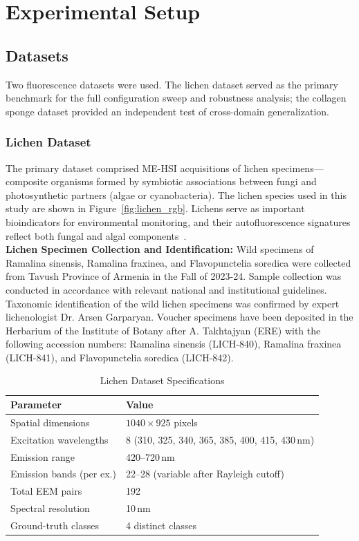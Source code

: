 \section{Experimental Setup}
\label{sec:experimental_setup}
\subsection{Datasets}
\label{sec:datasets}

Two fluorescence datasets were used. The lichen dataset served as the primary benchmark for the full configuration sweep and robustness analysis; the collagen sponge dataset provided an independent test of cross-domain generalization.

\subsubsection{Lichen Dataset}
\label{sec:dataset_lichen}

The primary dataset comprised ME-HSI acquisitions of lichen specimens---composite organisms formed by symbiotic associations between fungi and photosynthetic partners (algae or cyanobacteria).
The lichen species used in this study are shown in Figure~\ref{fig:lichen_rgb}.
Lichens serve as important bioindicators for environmental monitoring, and their autofluorescence signatures reflect both fungal and algal components~\cite{meysurova2021optical}.\\
\textbf{Lichen Specimen Collection and Identification:} Wild specimens of Ramalina sinensis, Ramalina fraxinea, and Flavopunctelia soredica were collected from Tavush Province of Armenia in the Fall of 2023-24. Sample collection was conducted in accordance with relevant national and institutional guidelines. Taxonomic identification of the wild lichen specimens was confirmed by expert lichenologist Dr. Arsen Garparyan. Voucher specimens have been deposited in the Herbarium of the Institute of Botany after A. Takhtajyan (ERE) with the following accession numbers: Ramalina sinensis (LICH-840), Ramalina fraxinea (LICH-841), and Flavopunctelia soredica (LICH-842).

\begin{table}[!t]
\centering
\caption{Lichen Dataset Specifications}
\label{tab:dataset}
\begin{tabular}{@{}ll@{}}
\toprule
\textbf{Parameter} & \textbf{Value} \\
\midrule
Spatial dimensions & $1040 \times 925$ pixels \\
Excitation wavelengths & 8 (310, 325, 340, 365, 385, 400, 415, 430\,nm) \\
Emission range & 420--720\,nm \\
Emission bands (per ex.) & 22--28 (variable after Rayleigh cutoff) \\
Total EEM pairs & 192 \\
Spectral resolution & 10\,nm \\
Ground-truth classes & 4 distinct classes \\
\bottomrule
\end{tabular}
\end{table}


